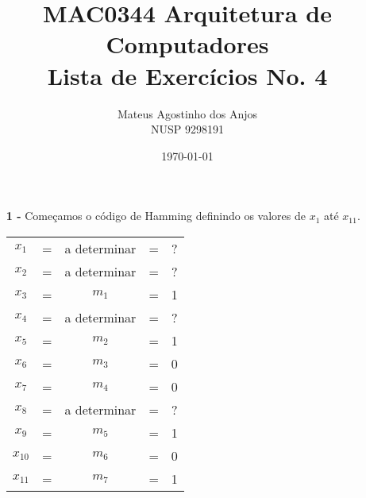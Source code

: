 \documentclass[12pt]{article}
\title{MAC0344 Arquitetura de Computadores\\
Lista de Exercícios No. 4
}
\author{Mateus Agostinho dos Anjos\\NUSP 9298191}
\date{\today}
\begin{document}
	\maketitle
	\begin{itemize}
		\item[\textbf{1 -}]
			\hfill\newline
			Começamos o código de Hamming definindo os valores de $x_1$ até $x_{11}$.
			\begin{center}
				\begin{tabular}{ccccc}
					$x_1$ & = & a determinar & = & ?\\
					$x_2$ & = & a determinar& = & ?\\
					$x_3$ & = & $m_1$ & = & 1 \\
					$x_4$ & = & a determinar & = & ?\\
					$x_5$ & = & $m_2$ & = & 1\\
					$x_6$ & = & $m_3$ & = & 0\\
					$x_7$ & = & $m_4$ & = & 0\\
					$x_8$ & = & a determinar & = & ?\\
					$x_9$ & = & $m_5$ & = & 1\\
					$x_{10}$ & = & $m_6$ & = & 0\\
					$x_{11}$ & = & $m_7$ & =& 1\\
				\end{tabular}
			\end{center}
	\end{itemize}
\end{document}
